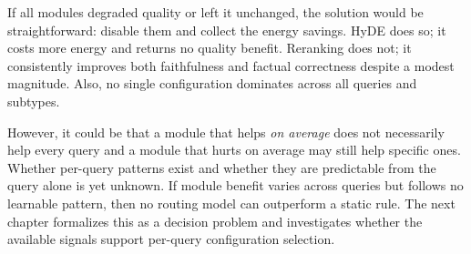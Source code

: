 
If all modules degraded quality or left it unchanged, the solution would be
straightforward: disable them and collect the energy savings. HyDE does so;
it costs more energy and returns no
quality benefit. Reranking does not; it consistently improves both
faithfulness and factual correctness despite a modest magnitude.
Also, no single configuration dominates across all queries and subtypes.

However, it could be that a module that helps \emph{on average} does not necessarily help every
query and a module that hurts on average may still help specific ones. Whether
per-query patterns exist and whether they are predictable from the query
alone is yet unknown. If module benefit varies across
queries but follows no learnable pattern, then no routing model can outperform
a static rule. The next chapter formalizes this as a decision
problem and investigates whether the available signals support per-query
configuration selection.
